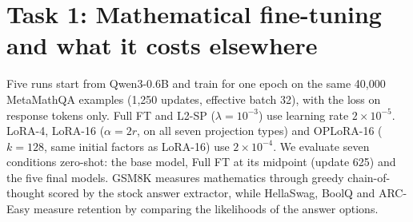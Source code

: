 \section{Task 1: Mathematical fine-tuning and what it costs elsewhere}
\label{sec:task1}

Five runs start from Qwen3-0.6B and train for one epoch on the same 40,000 MetaMathQA examples (1,250 updates, effective batch 32), with the loss on response tokens only. Full FT and L2-SP ($\lambda=10^{-3}$) use learning rate $2\times10^{-5}$. LoRA-4, LoRA-16 ($\alpha=2r$, on all seven projection types) and OPLoRA-16 ($k=128$, same initial factors as LoRA-16) use $2\times10^{-4}$. We evaluate seven conditions zero-shot: the base model, Full FT at its midpoint (update 625) and the five final models. GSM8K measures mathematics through greedy chain-of-thought scored by the stock answer extractor, while HellaSwag, BoolQ and ARC-Easy measure retention by comparing the likelihoods of the answer options.

